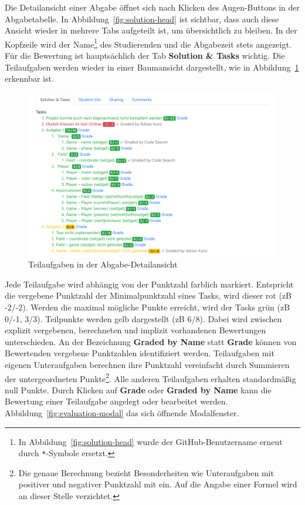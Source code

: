 Die Detailansicht einer Abgabe öffnet sich nach Klicken des Augen-Buttons in der Abgabetabelle.
In Abbildung~\ref{fig:solution-head} ist sichtbar, dass auch diese Ansicht wieder in mehrere Tabs aufgeteilt ist, um übersichtlich zu bleiben.
In der Kopfzeile wird der Name\footnote{
    In Abbildung~\ref{fig:solution-head} wurde der GitHub-Benutzername erneut durch \texttt{*}-Symbole ersetzt.
} des Studierenden und die Abgabezeit stets angezeigt.
Für die Bewertung ist hauptsächlich der Tab \textbf{Solution \& Tasks} wichtig.
Die Teilaufgaben werden wieder in einer Baumansicht dargestellt, wie in Abbildung~\ref{fig:solution-tasks} erkennbar ist.

\begin{figure}
    \centering
    \includegraphics[width=\textwidth]{images/solution-tasks}
    \caption{Teilaufgaben in der Abgabe-Detailansicht}
    \label{fig:solution-tasks}
\end{figure}

Jede Teilaufgabe wird abhängig von der Punktzahl farblich markiert.
Entspricht die vergebene Punktzahl der Minimalpunktzahl eines Tasks, wird dieser rot (\ac{zB} -2/-2).
Werden die maximal mögliche Punkte erreicht, wird der Tasks grün (\ac{zB} 0/-1, 3/3).
Teilpunkte werden gelb dargestellt (\ac{zB} 6/8).
Dabei wird zwischen explizit vergebenen, berechneten und implizit vorhandenen Bewertungen unterschieden.
An der Bezeichnung \textbf{Graded by Name} statt \textbf{Grade} können von Bewertenden vergebene Punktzahlen identifiziert werden.
Teilaufgaben mit eigenen Unteraufgaben berechnen ihre Punktzahl vereinfacht durch Summieren der untergeordneten Punkte\footnote{
    Die genaue Berechnung bezieht Besonderheiten wie Unteraufgaben mit positiver und negativer Punktzahl mit ein.
    Auf die Angabe einer Formel wird an dieser Stelle verzichtet.
}.
Alle anderen Teilaufgaben erhalten standardmäßig null Punkte.
Durch Klicken auf \textbf{Grade} oder \textbf{Graded by Name} kann die Bewertung einer Teilaufgabe angelegt oder bearbeitet werden.
Abbildung~\ref{fig:evaluation-modal} das sich öffnende Modalfenster.

